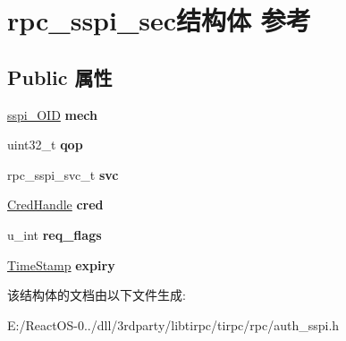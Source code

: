 \hypertarget{structrpc__sspi__sec}{}\section{rpc\+\_\+sspi\+\_\+sec结构体 参考}
\label{structrpc__sspi__sec}
\subsection*{Public 属性}
\begin{DoxyCompactItemize}
\item 
\mbox{\label{structrpc__sspi__sec_a7f05d36547b517032f7ea568dd4a8860}} 
\hyperlink{struct__sspi___o_i_d__desc}{sspi\+\_\+\+O\+ID} {\bfseries mech}
\item 
\mbox{\label{structrpc__sspi__sec_a4db239821ee4cf353c32808bdb0ac373}} 
uint32\+\_\+t {\bfseries qop}
\item 
\mbox{\label{structrpc__sspi__sec_a7edd6f4d518fc785dbe10d94300e0c27}} 
rpc\+\_\+sspi\+\_\+svc\+\_\+t {\bfseries svc}
\item 
\mbox{\label{structrpc__sspi__sec_afbf0a9cdee05f57714d4eb8227cfaf39}} 
\hyperlink{struct___sec_handle}{Cred\+Handle} {\bfseries cred}
\item 
\mbox{\label{structrpc__sspi__sec_af6494c79d6a70dfd8fbc181043875fae}} 
u\+\_\+int {\bfseries req\+\_\+flags}
\item 
\mbox{\label{structrpc__sspi__sec_a11b72204b4d7c7d3ae26cbbc9a302756}} 
\hyperlink{struct___s_e_c_u_r_i_t_y___i_n_t_e_g_e_r}{Time\+Stamp} {\bfseries expiry}
\end{DoxyCompactItemize}


该结构体的文档由以下文件生成\+:\begin{DoxyCompactItemize}
\item 
E\+:/\+React\+O\+S-\/0../dll/3rdparty/libtirpc/tirpc/rpc/auth\+\_\+sspi.\+h\end{DoxyCompactItemize}
